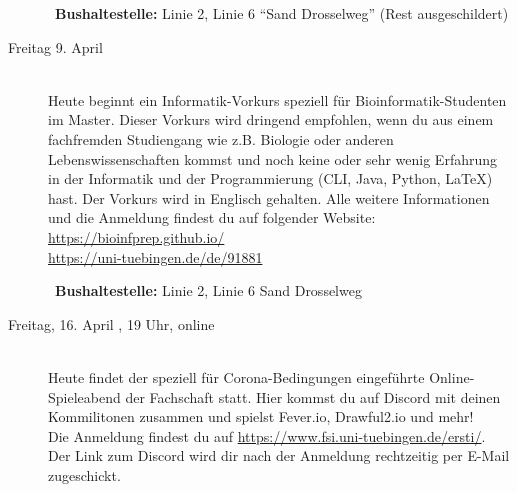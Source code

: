 \begin{description}
	~\textbf{Bushaltestelle:} Linie 2, Linie 6 "`Sand Drosselweg"' (Rest ausgeschildert)
    \fi
\fi

\ifmaster
    \ifbinfo
        \item[Freitag 9. April \YEAR]\ \\
            Heute beginnt ein Informatik-Vorkurs speziell für Bioinformatik-Studenten im Master. Dieser Vorkurs wird dringend empfohlen, wenn du aus einem fachfremden Studiengang wie z.B. Biologie oder anderen Lebenswissenschaften kommst und noch keine oder sehr wenig Erfahrung in der Informatik und der Programmierung (CLI, Java, Python, \LaTeX) hast. Der Vorkurs wird in Englisch gehalten. Alle weitere Informationen und die Anmeldung findest du auf folgender Website: \url{https://bioinfprep.github.io/} \\
            \url{https://uni-tuebingen.de/de/91881}

        ~\textbf{Bushaltestelle:} Linie 2, Linie 6 Sand Drosselweg
    \fi
\fi

\ifml
\else
    \item[Freitag, 16. April \YEAR, 19 Uhr, online]\ \\
        Heute findet der speziell für Corona-Bedingungen eingeführte Online-Spieleabend der Fachschaft statt. Hier kommst du auf Discord mit deinen Kommilitonen zusammen und spielst Fever.io, Drawful2.io und mehr!\\ 
        Die Anmeldung findest du auf \url{https://www.fsi.uni-tuebingen.de/ersti/}.\\
        Der Link zum Discord wird dir nach der Anmeldung rechtzeitig per E-Mail zugeschickt.
\fi


\end{description}
